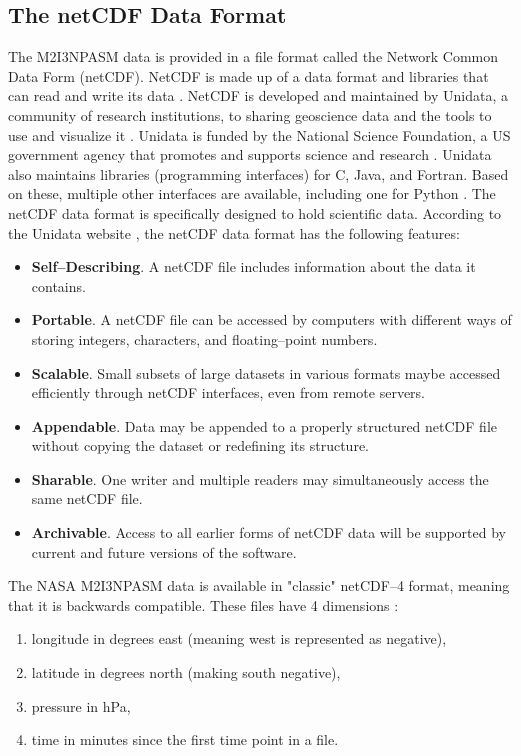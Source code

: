 \documentclass[../00_main.tex]{subfiles}
\begin{document}
\subsection{The netCDF Data Format}

The M2I3NPASM data is provided in a file format called the Network Common Data 
Form 
(netCDF). NetCDF is made up of a data format and libraries that can read and
write its data \cite{netcdf}. 
NetCDF is developed and maintained by Unidata, a community of
research institutions, to sharing geoscience data and the tools
to use and visualize it \cite{unidata}. 
Unidata is funded by the National Science Foundation,
a US government agency that promotes and supports science and research
\cite{nsf}.
Unidata also maintains libraries (programming interfaces) for C, Java, and
Fortran. Based on these, multiple other interfaces are available, including one
for Python \cite{netcdf-facts}.\newline
The netCDF data format is specifically designed to hold scientific data.
According to the Unidata website \cite{netcdf}, the netCDF data format has the 
following features:
\begin{itemize}
    \item \textbf{Self--Describing}. A netCDF file includes information about 
        the data it contains.
    \item \textbf{Portable}. A netCDF file can be accessed by computers with 
        different ways of storing integers, characters, and floating--point 
        numbers.
    \item \textbf{Scalable}. Small subsets of large datasets in various formats 
        maybe accessed efficiently through netCDF interfaces, even from remote 
        servers.
    \item \textbf{Appendable}. Data may be appended to a properly structured 
        netCDF file without copying the dataset or redefining its structure.
    \item \textbf{Sharable}. One writer and multiple readers may simultaneously 
        access the same netCDF file.
    \item \textbf{Archivable}. Access to all earlier forms of netCDF data will 
        be supported by current and future versions of the software.
\end{itemize}
The NASA M2I3NPASM data is available in "classic" netCDF--4 format, meaning that
it is backwards compatible. These files have 4 dimensions \cite{merra2-files}:
\begin{enumerate}
    \item longitude in degrees east (meaning west is represented as negative),
    \item latitude in degrees north (making south negative),
    \item pressure in hPa,
    \item time in minutes since the first time point in a file.
\end{enumerate}
\end{document}
